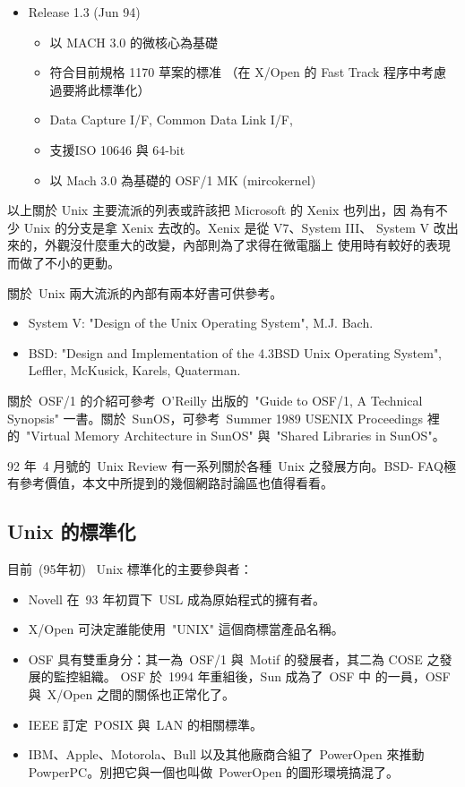 \documentclass{article}
\begin{document}
\begin{CJK*}{Bg5}{ming}
{\begin{itemize}
         \item Release 1.3 (Jun 94)
	 \begin{itemize}
           \item 以 MACH 3.0 的微核心為基礎
           \item 符合目前規格 1170 草案的標准
            （在 X/Open 的 Fast Track 程序中考慮過要將此標準化）
           \item Data Capture I/F, Common Data Link I/F,
           \item 支援ISO 10646 與 64-bit
           \item 以 Mach 3.0 為基礎的 OSF/1 MK (mircokernel)
	 \end{itemize}
\end{itemize}

    以上關於 Unix 主要流派的列表或許該把 Microsoft 的 Xenix 也列出，因
    為有不少 Unix 的分支是拿 Xenix 去改的。Xenix 是從 V7、System III、
    System V 改出來的，外觀沒什麼重大的改變，內部則為了求得在微電腦上
    使用時有較好的表現而做了不小的更動。

    關於~Unix 兩大流派的內部有兩本好書可供參考。
\begin{itemize}
      \item System V: "Design of the Unix Operating System", M.J. Bach.
      \item BSD: "Design and Implementation of the 4.3BSD Unix Operating System",
        Leffler, McKusick, Karels, Quaterman.
\end{itemize}
    關於~OSF/1 的介紹可參考~O'Reilly 出版的~"Guide to OSF/1, A Technical 
    Synopsis" 一書。關於~SunOS，可參考~Summer 1989 USENIX Proceedings
    裡的~"Virtual Memory Architecture in SunOS" 與~"Shared Libraries in 
    SunOS"。

    92 年~4 月號的~Unix Review 有一系列關於各種~Unix 之發展方向。BSD-
    FAQ極有參考價值，本文中所提到的幾個網路討論區也值得看看。

\subsection{Unix 的標準化}

     目前~(95年初) ~Unix 標準化的主要參與者：
\begin{itemize}
      \item Novell 在~93 年初買下~USL 成為原始程式的擁有者。
      \item X/Open 可決定誰能使用~"UNIX" 這個商標當產品名稱。
      \item OSF 具有雙重身分：其一為~OSF/1 與~Motif 的發展者，其二為 COSE 
        之發展的監控組織。 OSF 於~1994 年重組後，Sun 成為了~OSF 中
        的一員，OSF 與~X/Open 之間的關係也正常化了。
      \item IEEE 訂定~POSIX 與~LAN 的相關標準。
      \item IBM、Apple、Motorola、Bull 以及其他廠商合組了~PowerOpen 來推動
        PowperPC。別把它與一個也叫做~PowerOpen 的圖形環境搞混了。
\end{itemize}

}
\end{CJK*}
\end{document}
